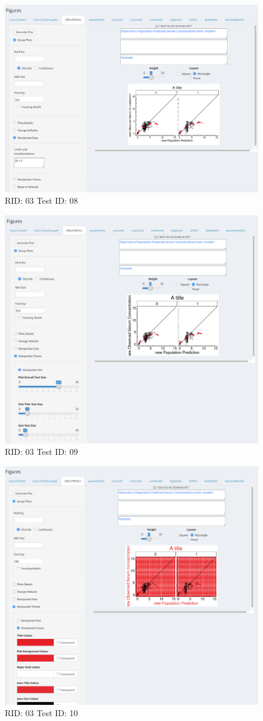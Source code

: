 \begin{figure}[H]
\includegraphics[width=.8\textwidth]{screencaps/03-08-1.png}
\caption{RID: 03 Test ID: 08}
\end{figure}
\begin{figure}[H]
\includegraphics[width=.8\textwidth]{screencaps/03-09-1.png}
\caption{RID: 03 Test ID: 09}
\end{figure}
\begin{figure}[H]
\includegraphics[width=.8\textwidth]{screencaps/03-10-1.png}
\caption{RID: 03 Test ID: 10}
\end{figure}
